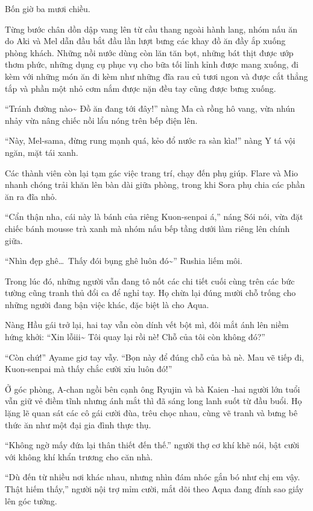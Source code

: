 \documentclass[../main.tex]{subfiles}
\begin{document}
Bốn giờ ba mươi chiều.

Từng bước chân dồn dập vang lên từ cầu thang ngoài hành lang, nhóm nấu ăn do Aki và Mel dẫn đầu bắt đầu lần lượt bưng các khay đồ ăn đầy ắp xuống phòng khách. Những nồi nước dùng còn lăn tăn bọt, những bát thịt được ướp thơm phức, những dụng cụ phục vụ cho bữa tối lỉnh kỉnh được mang xuống, đi kèm với những món ăn đi kèm như những đĩa rau củ tươi ngon và được cắt thẳng tắp và phần một nhỏ cơm nắm được nặn đều tay cũng được bưng xuống.

``Tránh đường nào\~{} Đồ ăn đang tới đây!'' nàng Ma cà rồng hô vang, vừa nhún nhảy vừa nâng chiếc nồi lẩu nóng trên bếp điện lên.

``Này, Mel-sama, đừng rung mạnh quá, kẻo đổ nước ra sàn kìa!'' nàng Y tá vội ngăn, mặt tái xanh.

Các thành viên còn lại tạm gác việc trang trí, chạy đến phụ giúp. Flare và Mio nhanh chóng trải khăn lên bàn dài giữa phòng, trong khi Sora phụ chia các phần ăn ra đĩa nhỏ.

``Cẩn thận nha, cái này là bánh của riêng Kuon-senpai á,'' náng Sói nói, vừa đặt chiếc bánh mousse trà xanh mà nhóm nấu bếp tầng dưới làm riêng lên chính giữa.

``Nhìn đẹp ghê\dots\ Thấy đói bụng ghê luôn đó\~{}'' Rushia liếm môi.

Trong lúc đó, những người vẫn đang tô nốt các chi tiết cuối cùng trên các bức tường cũng tranh thủ đổi ca để nghỉ tay. Họ chừa lại đúng mười chỗ trống cho những người đang bận việc khác, đặc biệt là cho Aqua.

Nàng Hầu gái trở lại, hai tay vẫn còn dính vết bột mì, đôi mắt ánh lên niềm hứng khởi: ``Xin lỗiii\~{} Tôi quay lại rồi nè! Chỗ của tôi còn không đó?''

``Còn chứ!'' Ayame giơ tay vẫy. ``Bọn này để đúng chỗ của bà nè. Mau vẽ tiếp đi, Kuon-senpai mà thấy chắc cười xỉu luôn đó!''

Ở góc phòng, A-chan ngồi bên cạnh ông Ryujin và bà Kaien -hai người lớn tuổi vẫn giữ vẻ điềm tĩnh nhưng ánh mắt thì đã sáng long lanh suốt từ đầu buổi. Họ lặng lẽ quan sát các cô gái cười đùa, trêu chọc nhau, cùng vẽ tranh và bưng bê thức ăn như một đại gia đình thực thụ.

``Không ngờ mấy đứa lại thân thiết đến thế.'' người thợ cơ khí khẽ nói, bật cười với không khí khẩn trương cho căn nhà.

``Dù đến từ nhiều nơi khác nhau, nhưng nhìn đám nhóc gắn bó như chị em vậy. Thật hiếm thấy,'' người nội trợ mỉm cười, mắt dõi theo Aqua đang đính sao giấy lên góc tường.
\end{document}
